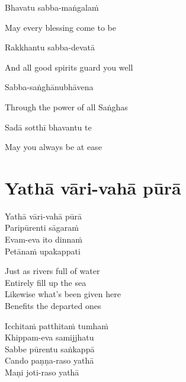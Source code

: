Bhavatu sabba-maṅgalaṁ

\begin{english}
  May every blessing come to be
\end{english}

Rakkhantu sabba-devatā

\begin{english}
  And all good spirits guard you well
\end{english}

Sabba-saṅghānubhāvena

\begin{english}
  Through the power of all Saṅghas
\end{english}

Sadā sotthī bhavantu te

\begin{english}
  May you always be at ease
\end{english}



\setsecheadstyle{\subsectionFmt}
\section{Yathā vāri-vahā pūrā}
\label{yatha-vari-vaha-pura}

\vspace{-0.6em}

\begin{pali-hang}
  Yathā vāri-vahā pūrā\\
  Paripūrenti sāgaraṁ\\
  Evam-eva ito dinnaṁ\\
  Petānaṁ upakappati
\end{pali-hang}

\begin{english-verses}
  Just as rivers full of water\\
  Entirely fill up the sea\\
  Likewise what's been given here\\
  Benefits the departed ones\hyperlink{endnote118-appendix}{\hypertarget{endnote118-body}{}}
\end{english-verses}

\suttaRef{[Khp 1.7]}

\begin{pali-hang-continued}
  Icchitaṁ patthitaṁ tumhaṁ\\
  Khippam-eva samijjhatu\\
  Sabbe pūrentu saṅkappā\\
  Cando paṇṇa-raso yathā\\
  Maṇi joti-raso yathā\hyperlink{endnote119-appendix}{\hypertarget{endnote119-body}{}}
\end{pali-hang-continued}

